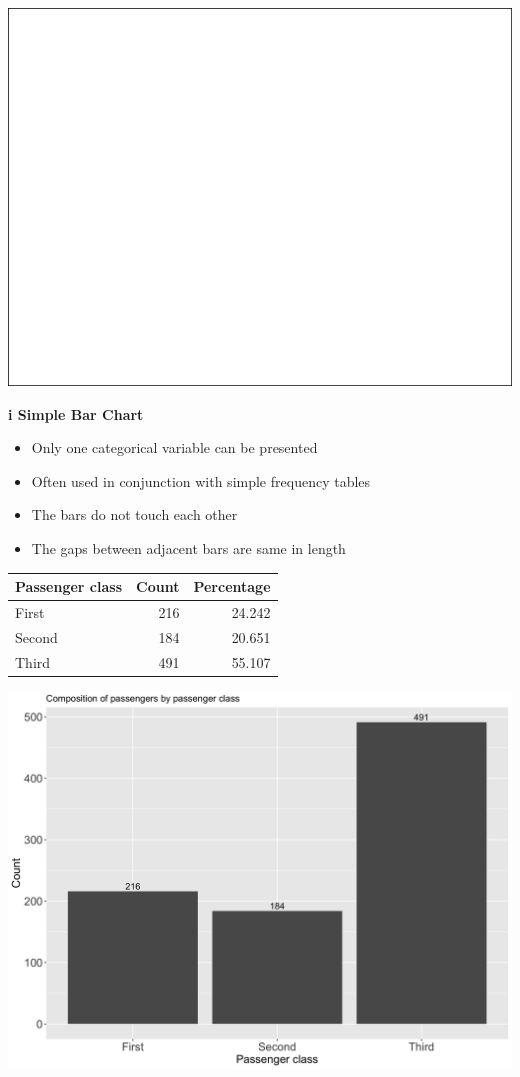 \documentclass[]{book}
\providecommand{\tightlist}{%
  \setlength{\itemsep}{0pt}\setlength{\parskip}{0pt}}
\begin{document}
\begin{center}\includegraphics[width=1\linewidth]{figure/box6-1} \end{center}

\textbf{i Simple Bar Chart}

\begin{itemize}
\tightlist
\item
  Only one categorical variable can be presented
\item
  Often used in conjunction with simple frequency tables
\item
  The bars do not touch each other
\item
  The gaps between adjacent bars are same in length
\end{itemize}

\begin{tabular}{l|r|r}
\hline
Passenger class & Count & Percentage\\
\hline
First & 216 & 24.242\\
\hline
Second & 184 & 20.651\\
\hline
Third & 491 & 55.107\\
\hline
\end{tabular}

\begin{center}\includegraphics[width=0.8\linewidth]{figure/box8-1} \end{center}
\end{document}

